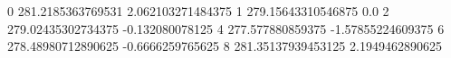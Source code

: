 0 281.2185363769531 2.062103271484375
1 279.15643310546875 0.0
2 279.02435302734375 -0.132080078125
4 277.577880859375 -1.57855224609375
6 278.48980712890625 -0.6666259765625
8 281.35137939453125 2.1949462890625

